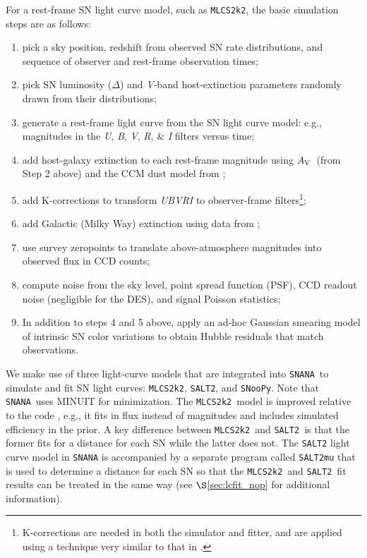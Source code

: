 \documentclass[preprint2]{aastex}    %
\newcommand\av{$A_{\rm V}$}
\newcommand{\mlcs}{{\tt MLCS2k2}}
\newcommand{\salt}{{\tt SALT2}}
\newcommand{\saltm}{{\tt SALT2mu}}
\newcommand{\snoop}{{\tt SNooPy}}
\newcommand{\snana}{{\tt SNANA}}
\begin{document}
For a rest-frame SN light curve model, such as \mlcs, the basic simulation steps are as follows:

\begin{enumerate}
  \item pick a sky position, redshift from observed SN rate distributions, and sequence 
of observer and rest-frame observation times;
  \item	pick SN luminosity ($\Delta$) and \textit{V}-band host-extinction \citep[\av, the amount of 
dust extinction in magnitudes from][]{car89} parameters randomly drawn from their distributions;
  \item	generate a rest-frame light curve from the SN light curve model: e.g., 
magnitudes in the \textit{U}, \textit{B}, 
\textit{V}, \textit{R}, \& \textit{I} filters \citep{bes90} versus time;
  \item	add host-galaxy extinction to each rest-frame magnitude using \av\ (from Step 2 above) and the CCM dust model from \cite{car89};
  \item	add K-corrections \citep[][]{nug02} to transform \textit{UBVRI} to observer-frame 
filters\footnote{K-corrections are needed in both the simulator and fitter, and are applied using a technique 
very similar to that in \cite{jha07}.};
  \item	add Galactic (Milky Way) extinction using data from \cite{sch98};
  \item	use survey zeropoints to translate above-atmosphere magnitudes into observed 
flux in CCD counts;
  \item	compute noise from the sky level, point spread function (PSF), CCD readout noise (negligible for the DES), and signal Poisson statistics;
  \item In addition to steps 4 and 5 above, apply an ad-hoc Gaussian smearing model of intrinsic SN color variations to 
obtain Hubble residuals that match observations.
\end{enumerate}

We make use of three light-curve models that are integrated into \snana\ to simulate and fit SN 
light curves: \mlcs, \salt, and \snoop. Note that \snana\ uses MINUIT \citep{jam94} for minimization. 
The \mlcs\ model is improved relative to the \cite{jha07} 
code \citep[see $\S$5.1 and Appendix B of][]{kes09}, e.g., it fits in flux instead of 
magnitudes and includes simulated efficiency in the prior. A key difference between \mlcs\ 
and \salt\ is that the former fits for a distance for each SN while the latter does not. 
The {\salt} light curve model in {\snana} is accompanied by a separate program 
called {\saltm} \citep{mar11} that is used to determine a distance for each SN so 
that the \mlcs\ and \salt\ fit results can be treated in the same way 
(see $\S$\ref{sec:lcfit_nop} for additional information).
\end{document}
